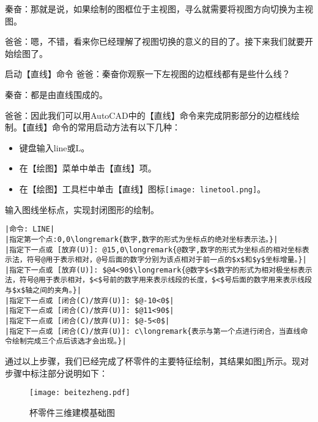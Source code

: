 \begin{procedure}
秦奋：那就是说，如果绘制的图框位于主视图，寻么就需要将视图方向切换为主视图。

爸爸：嗯，不错，看来你已经理解了视图切换的意义的目的了。接下来我们就要开始绘图了。
\item 启动【直线】命令
爸爸：秦奋你观察一下左视图的边框线都有是些什么线？

秦奋：都是由直线围成的。

爸爸：因此我们可以用AutoCAD中的【直线】命令来完成阴影部分的边框线绘制。【直线】命令的常用启动方法有以下几种：
\begin{itemize}
\item 键盘输入line或L。
\item 在【绘图】菜单中单击【直线】项。
\item 在【绘图】工具栏中单击【直线】图标\texttt{[image: linetool.png]}。
\end{itemize}
\item 输入图线坐标点，实现封闭图形的绘制。

\begin{lstlisting}
|命令: LINE|
|指定第一个点:0,0\longremark{数字,数字的形式为坐标点的绝对坐标表示法。}|
|指定下一点或 [放弃(U)]: @15,0\longremark{@数字,数字的形式为坐标点的相对坐标表示法，符号@用于表示相对，@号后面的数字分别为该点相对于前一点的$x$和$y$坐标增量。}|
|指定下一点或 [放弃(U)]: $@4<90$\longremark{@数字$<$数字的形式为相对极坐标表示法，符号@用于表示相对，$<$号前的数字用来表示线段的长度，$<$号后面的数字用来表示线段与$x$轴之间的夹角。}|
|指定下一点或 [闭合(C)/放弃(U)]: $@-10<0$|
|指定下一点或 [闭合(C)/放弃(U)]: $@11<90$|
|指定下一点或 [闭合(C)/放弃(U)]: $@-5<0$|
|指定下一点或 [闭合(C)/放弃(U)]: c\longremark{表示与第一个点进行闭合，当直线命令绘制完成三个点后该选才会出现。}|
\end{lstlisting}
\end{procedure}

通过以上步骤，我们已经完成了杯零件的主要特征绘制，其结果如图\ref{fig:bettezheng}所示。现对步骤中标注部分说明如下：
\showremarks
\noindent
\begin{figure}[htbp]
\centering
\texttt{[image: beitezheng.pdf]}
\caption{杯零件三维建模基础图}\label{fig:bettezheng}
\end{figure}

